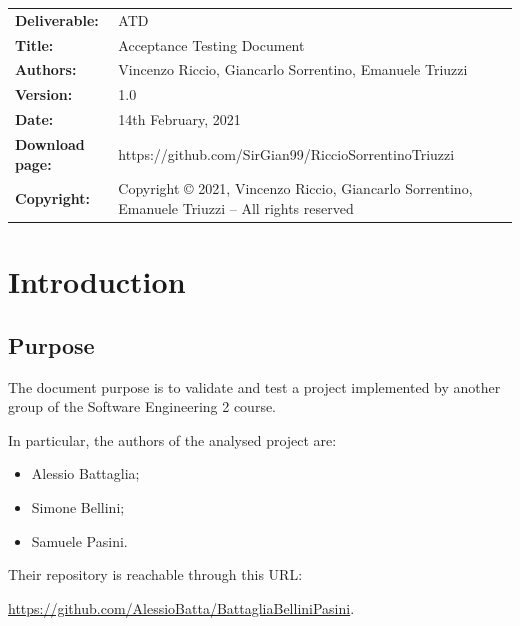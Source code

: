 \documentclass[a4paper,oneside,11pt]{book}
\begin{document}
\newpage
\begin{table}[H]
    \begin{tabu} to \textwidth { X[0.3,r,p] X[0.7,l,p] }
        \hline
        \textbf{Deliverable:}   & ATD\\
        \textbf{Title:}         & Acceptance Testing Document \\
        \textbf{Authors:}       & Vincenzo Riccio, Giancarlo Sorrentino, \newline Emanuele Triuzzi \\
        \textbf{Version:}       & 1.0 \\ 
        \textbf{Date:}          & 14th February, 2021 \\
        \textbf{Download page:} & https://github.com/SirGian99/RiccioSorrentinoTriuzzi \\
        \textbf{Copyright:}     & Copyright © 2021, Vincenzo Riccio, Giancarlo Sorrentino, Emanuele Triuzzi -- All rights reserved \\
        \hline
    \end{tabu}
\end{table}


\tableofcontents
\newpage
{}

\chapter{Introduction}
    \section{Purpose}
    The document purpose is to validate and test a project implemented by another group of the Software Engineering 2 course. \par
    In particular, the authors of the analysed project are:
    \begin{itemize}
        \item Alessio Battaglia;
        \item Simone Bellini;
        \item Samuele Pasini.
    \end{itemize}
    Their repository is reachable through this URL: \par
    \url{https://github.com/AlessioBatta/BattagliaBelliniPasini}.
    
\end{document}
